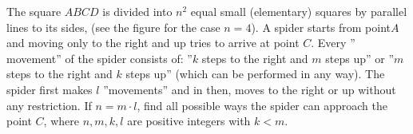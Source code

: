 The square $ABCD$ is divided into $n^2$ equal small (elementary) squares by parallel lines to its sides, (see the figure for the case $n = 4$). A spider starts from point$ A$ and moving only to the right and up tries to arrive at point $C$. Every ” movement” of the spider consists of: ”$k$ steps to the right and $m$ steps up” or ”$m$ steps to the right and $k$ steps up” (which can be performed in any way). The spider first makes $l$ ”movements” and in then, moves to the right or up without any restriction. If $n = m \cdot l$, find all possible ways the spider can approach the point $C$, where $n, m, k, l$ are positive integers with $k < m$.
